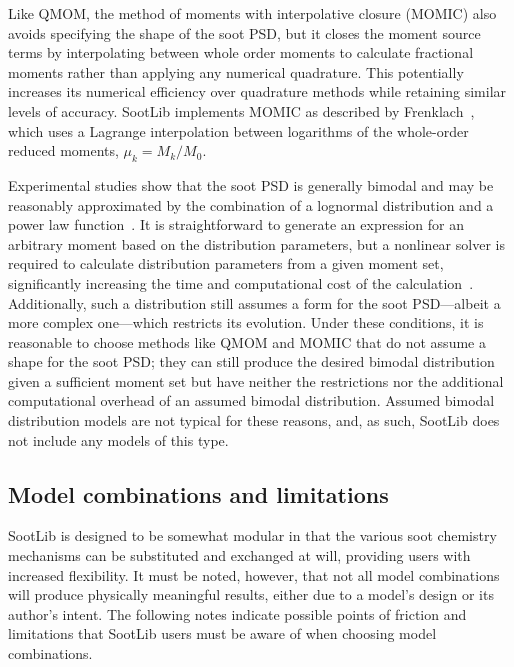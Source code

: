 \documentclass[preprint,letterpaper]{elsarticle}
\begin{document}

Like QMOM, the method of moments with interpolative closure (MOMIC) also avoids specifying the shape of the soot PSD, but it closes the moment source terms by interpolating between whole order moments to calculate fractional moments rather than applying any numerical quadrature. This potentially increases its numerical efficiency over quadrature methods while retaining similar levels of accuracy. SootLib implements MOMIC as described by Frenklach~\cite{Frenklach_2002b,Frenklach_1987}, which uses a Lagrange interpolation between logarithms of the  whole-order reduced moments, $\mu_k = M_k/M_0$.

Experimental studies show that the soot PSD is generally bimodal and may be reasonably approximated by the combination of a lognormal distribution and a power law function~\cite{Wang_2011}. It is straightforward to generate an expression for an arbitrary moment based on the distribution parameters, but a nonlinear solver is required to calculate distribution parameters from a given moment set, significantly increasing the time and computational cost of the calculation~\cite{Lignell_2008b}. Additionally, such a distribution still assumes a form for the soot PSD---albeit a more complex one---which restricts its evolution. Under these conditions, it is reasonable to choose methods like QMOM and MOMIC that do not assume a shape for the soot PSD; they can still produce the desired bimodal distribution given a sufficient moment set but have neither the restrictions nor the additional computational overhead of an assumed bimodal distribution. Assumed bimodal distribution models are not typical for these reasons, and, as such, SootLib does not include any models of this type.


\subsection{Model combinations and limitations}
\label{ss:limitations}

SootLib is designed to be somewhat modular in that the various soot chemistry mechanisms can be substituted and exchanged at will, providing users with increased flexibility. It must be noted, however, that not all model combinations will produce physically meaningful results, either due to a model's design or its author's intent. The following notes indicate possible points of friction and limitations that SootLib users must be aware of when choosing model combinations.
\end{document}
